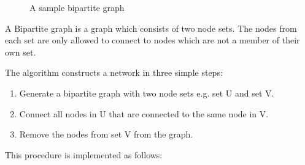 \documentclass[a4paper,11pt,titlepage]{article}
\begin{document}
\begin{wrapfigure}{R}{0.4\textwidth}
  \begin{center}
    
  \end{center}
  \caption{A sample bipartite graph}
\end{wrapfigure}

A Bipartite graph is a graph which consists of two node sets. The nodes from
each set are only allowed to connect to nodes which are not a member of their
own set.

The algorithm constructs a network in three simple steps:
\begin{enumerate}
   \item Generate a bipartite graph with two node sets e.g. set U and set V.
   \item Connect all nodes in U that are connected to the same node in V.
   \item Remove the nodes from set V from the graph.
\end{enumerate}

This procedure is implemented as follows:
\end{document}
